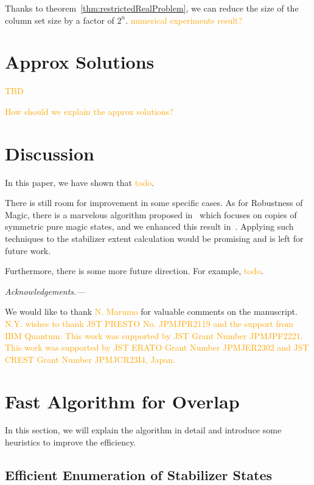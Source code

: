 \documentclass[a4paper, onecolumn, 11pt, longbibliography]{quantumarticle}
\newcommand{\orange}[1]{\textcolor{orange}{#1}}
\begin{document}
Thanks to theorem~\ref{thm:restrictedRealProblem},
we can reduce the size of the column set size
by a factor of $2^n$.
\orange{numerical experiments result?}

\section{Approx Solutions}

\orange{TBD}

\orange{How should we explain the approx solutions?}

\section{Discussion}

In this paper, we have shown that \orange{todo}.

There is still room for improvement
in some specific cases.
As for Robustness of Magic,
there is a marvelous algorithm
proposed in~\cite{Heinrich2019robustnessofmagic}
which focuses on copies of symmetric pure magic states,
and we enhanced this result in~\cite{hamaguchiHandbookEfficientlyQuantifying2023}.
Applying such techniques to the stabilizer extent calculation
would be promising and is left for future work.

Furthermore, there is some more future direction.
For example, \orange{todo}.

\emph{Acknowledgements.---}

We would like to thank \orange{N. Marumo} for valuable comments on the manuscript.
\orange{N.Y. wishes to thank JST PRESTO No. JPMJPR2119 and the support
  from IBM Quantum. This work was supported by JST Grant Number JPMJPF2221.
  This work was supported by JST ERATO Grant Number JPMJER2302 and JST CREST
  Grant Number JPMJCR23I4, Japan.}




\appendix

\section{Fast Algorithm for Overlap}

In this section, we will explain the algorithm in detail
and introduce some heuristics to improve the efficiency.

\subsection{Efficient Enumeration of Stabilizer States}
\label{sec:efficientEnumeration}
\end{document}
